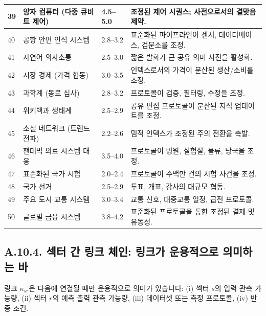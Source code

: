 \documentclass[13pt,a4paper]{article}
\begin{document}
\begin{longtable}{|p{0.8cm}|p{6.2cm}|p{3.0cm}|p{5.7cm}|}
		\hline
		39 & 양자 컴퓨터 (다중 큐비트 제어) & 4.5--5.0 & 조정된 제어 시퀀스; 사전으로서의 결맞음 제약. \\
		\hline
		40 & 공항 안면 인식 시스템 & 2.8--3.2 & 표준화된 파이프라인이 센서, 데이터베이스, 검문소를 조정. \\
		\hline
		41 & 자연어 의사소통 & 2.5--3.0 & 짧은 발화가 큰 공유 의미 사전을 활성화. \\
		\hline
		42 & 시장 경제 (가격 협동) & 3.0--3.5 & 인덱스로서의 가격이 분산된 생산/소비를 조정. \\
		\hline
		43 & 과학계 (동료 심사) & 2.8--3.2 & 프로토콜이 검증, 필터링, 수정을 조정. \\
		\hline
		44 & 위키백과 생태계 & 2.5--2.9 & 공유 편집 프로토콜이 분산된 지식 업데이트를 조정. \\
		\hline
		45 & 소셜 네트워크 (트렌드 전파) & 2.2--2.6 & 밈적 인덱스가 조정된 주의 전환을 촉발. \\
		\hline
		46 & 팬데믹 의료 시스템 대응 & 3.5--4.0 & 프로토콜이 병원, 실험실, 물류, 당국을 조정. \\
		\hline
		47 & 표준화된 국가 시험 & 2.0--2.4 & 프로토콜이 수백만 건의 시험 사건을 조정. \\
		\hline
		48 & 국가 선거 & 2.5--2.9 & 투표, 개표, 감사의 대규모 협동. \\
		\hline
		49 & 주요 도시 교통 시스템 & 3.0--3.4 & 교통 신호, 대중교통 일정, 급전 프로토콜. \\
		\hline
		50 & 글로벌 금융 시스템 & 3.8--4.2 & 표준화된 프로토콜을 통한 조정된 결제 및 유동성. \\
		\hline
	\end{longtable}
	
	\subsection*{A.10.4. 섹터 간 링크 체인: 링크가 운용적으로 의미하는 바}
	
	링크 $\kappa_{sr}$은 다음에 연결될 때만 운용적으로 의미가 있습니다:
	(i) 섹터 $s$의 입력 관측 가능량,
	(ii) 섹터 $r$의 예측 출력 관측 가능량,
	(iii) 데이터셋 또는 측정 프로토콜,
	(iv) 반증 조건.
	
\end{document}
